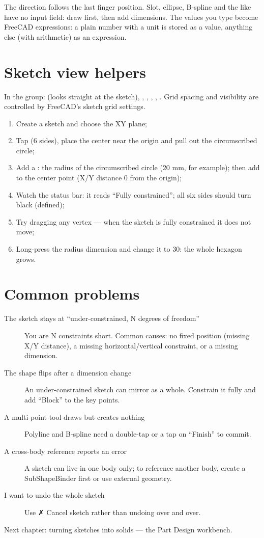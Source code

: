 The direction follows the last finger position. Slot, ellipse, B-spline and the like have no input field: draw first,
then add dimensions. The values you type become FreeCAD expressions: a plain number with a unit is stored as a value,
anything else (with arithmetic) as an expression.

\section{Sketch view helpers}

In the  group:  (looks straight at the sketch), , ,
, , . Grid spacing and visibility are controlled by FreeCAD's sketch
grid settings.

\begin{practice}
\begin{enumerate}
  \item Create a sketch and choose the XY plane;
  \item Tap  (6 sides), place the center near the origin and pull out the circumscribed circle;
  \item Add a : the radius of the circumscribed circle (20 mm, for example); then add  to the
        center point (X/Y distance 0 from the origin);
  \item Watch the status bar: it reads ``Fully constrained''; all six sides should turn black (defined);
  \item Try dragging any vertex --- when the sketch is fully constrained it does not move;
  \item Long-press the radius dimension and change it to 30: the whole hexagon grows.
\end{enumerate}
\end{practice}

\section{Common problems}

\begin{description}
  \item[The sketch stays at ``under-constrained, N degrees of freedom''] You are N constraints short. Common causes: no fixed position (missing X/Y distance), a missing horizontal/vertical constraint, or a missing dimension.
  \item[The shape flips after a dimension change] An under-constrained sketch can mirror as a whole. Constrain it fully and add ``Block'' to the key points.
  \item[A multi-point tool draws but creates nothing] Polyline and B-spline need a double-tap or a tap on ``Finish'' to commit.
  \item[A cross-body reference reports an error] A sketch can live in one body only; to reference another body, create a SubShapeBinder first or use external geometry.
  \item[I want to undo the whole sketch] Use ✗ Cancel sketch rather than undoing over and over.
\end{description}

Next chapter: turning sketches into solids --- the Part Design workbench.
